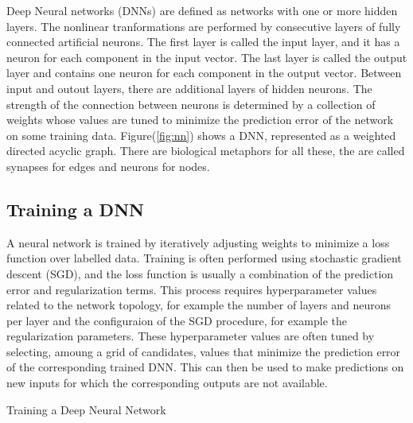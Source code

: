 \documentclass[letterpaper, 10 pt, conference]{ieeeconf}
\begin{document}
Deep Neural networks (DNNs) are defined as networks with one or more
hidden layers.
The nonlinear tranformations are performed by consecutive layers
of fully connected artificial neurons.
The first layer is called the input layer, and it has a neuron
for each component in the input vector.
The last layer is called the output layer and contains one neuron
for each component in the output vector.
Between input and outout layers, there are additional layers
of hidden neurons.
The strength of the connection between neurons is determined
by a collection of weights whose values are tuned to minimize
the prediction error of the network on some training data.
Figure(\ref{fig:nn}) shows a DNN, represented as a weighted 
directed acyclic graph.  There are biological metaphors for 
all these, the are called synapses for edges and neurons for nodes.


\subsection{Training a DNN}

A neural network is trained by iteratively adjusting weights to minimize
 a loss function over labelled data.
Training is often performed using stochastic gradient descent (SGD), and 
the loss function is usually a combination of the prediction error and 
regularization terms. This process requires hyperparameter values related to
the network topology, for example the number of layers and neurons per layer
and the configuraion of the SGD procedure, for example the regularization
parameters. These hyperparameter values are often tuned by selecting, 
amoung a grid of candidates, values that minimize the prediction error
of the corresponding trained DNN. This can then be used to make predictions
on new inputs for which the corresponding outputs are not available.

\begin{algorithm}
\caption{Training a Deep Neural Network}
\begin{algorithmic}[1]
\EndFor
\EndProcedure
\end{algorithmic}
\end{algorithm}
\end{document}
